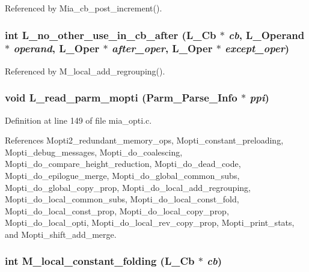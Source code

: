 Referenced by Mia\_\-cb\_\-post\_\-increment().
\subsubsection{\setlength{\rightskip}{0pt plus 5cm}int L\_\-no\_\-other\_\-use\_\-in\_\-cb\_\-after (L\_\-Cb $\ast$ {\em cb}, L\_\-Operand $\ast$ {\em operand}, L\_\-Oper $\ast$ {\em after\_\-oper}, L\_\-Oper $\ast$ {\em except\_\-oper})}\label{mia__opti_8h_5cfad794d6ca81cea76676f32c668147}




Referenced by M\_\-local\_\-add\_\-regrouping().
\subsubsection{\setlength{\rightskip}{0pt plus 5cm}void L\_\-read\_\-parm\_\-mopti (Parm\_\-Parse\_\-Info $\ast$ {\em ppi})}\label{mia__opti_8h_c4127ccba417f74a6dda847e3908e13f}




Definition at line 149 of file mia\_\-opti.c.

References Mopti2\_\-redundant\_\-memory\_\-ops, Mopti\_\-constant\_\-preloading, Mopti\_\-debug\_\-messages, Mopti\_\-do\_\-coalescing, Mopti\_\-do\_\-compare\_\-height\_\-reduction, Mopti\_\-do\_\-dead\_\-code, Mopti\_\-do\_\-epilogue\_\-merge, Mopti\_\-do\_\-global\_\-common\_\-subs, Mopti\_\-do\_\-global\_\-copy\_\-prop, Mopti\_\-do\_\-local\_\-add\_\-regrouping, Mopti\_\-do\_\-local\_\-common\_\-subs, Mopti\_\-do\_\-local\_\-const\_\-fold, Mopti\_\-do\_\-local\_\-const\_\-prop, Mopti\_\-do\_\-local\_\-copy\_\-prop, Mopti\_\-do\_\-local\_\-opti, Mopti\_\-do\_\-local\_\-rev\_\-copy\_\-prop, Mopti\_\-print\_\-stats, and Mopti\_\-shift\_\-add\_\-merge.
\subsubsection{\setlength{\rightskip}{0pt plus 5cm}int M\_\-local\_\-constant\_\-folding (L\_\-Cb $\ast$ {\em cb})}\label{mia__opti_8h_2f87ad062e11eb5db1b41aebeeb33243}


